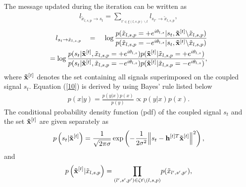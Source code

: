\documentclass[conference]{IEEEtran}
\begin{document}
The message updated during the iteration can be written as
\begin{equation}
\begin{aligned}
{l_{{{\tilde {x}}_{l,s,p}} \to {s_t}}} = \sum\limits_{_{t' \in \xi (l,s,p)\backslash t}} {{l_{{s_{t'}} \to {{\tilde {x}}_{l,s,p}}}}}\label{9},
\end{aligned}
\end{equation}
\begin{equation}
\begin{aligned}
{l_{{s_t} \to {{\tilde {x}}_{l,s,p}}}}\;\;\;{\kern 1pt}  = \;\;\;{\kern 1pt} \log \frac{{p({{\tilde {x}}_{l,s,p}} =  + {e^{i{\theta _{l,s}}}}|{s_t},{{\bf{\tilde x}}^{[t]}}\backslash {{\tilde {x}}_{l,s,p}})}}{{p({{\tilde {x}}_{l,s,p}} =  - {e^{i{\theta _{l,s}}}}|{s_t},{{\bf{\tilde x}}^{[t]}}\backslash {{\tilde {x}}_{l,s,p}})}} \\
= \log \frac{{p({s_t}|{{\bf{\tilde x}}^{[t]}},{{\tilde {x}}_{l,s,p}} =  + {e^{i{\theta _{l,s}}}})p({{\bf{\tilde x}}^{[t]}}|{{\tilde {x}}_{l,s,p}} =  + {e^{i{\theta _{l,s}}}})}}{{p({s_t}|{{\bf{\tilde x}}^{[t]}},{{\tilde {x}}_{l,s,p}} =  - {e^{i{\theta _{l,s}}}})p({{\bf{\tilde x}}^{[t]}}|{{\tilde {x}}_{l,s,p}} =  - {e^{i{\theta _{l,s}}}})}}\label{10},
\end{aligned}
\end{equation}
where ${{\bf{\tilde {\bf{x}}}}^{[t]}}$ denotes the set containing all signals superimposed on the coupled signal ${{s_t}}$. Equation (\ref{10}) is derived by using Bayes' rule listed below
\begin{equation}
\begin{aligned}
p(x|y) = \frac{{p(y|x)p(x)}}{{p(y)}}\propto p(y|x)p(x)\label{11}.
\end{aligned}
\end{equation}
The conditional probability density function (pdf) of the coupled signal ${{s_t}}$ and the set ${{\bf{\tilde x}}^{[t]}}$ are given separately as
\begin{equation}
p\left( {{s_t}|{{\bf{\tilde x}}^{[t]}}} \right) = \frac{1}{{\sqrt {2\pi \sigma } }}\exp \left( { - {\mkern 1mu} \frac{1}{{2{\sigma ^2}}}{{\left\| {{s_t} - {{\bf{h}}^{[t]T}}{{\bf{\tilde x}}^{[t]}}} \right\|}^2}} \right)\label{12},
\end{equation}
and
\begin{equation}
\begin{aligned}
p\left( {{{\bf{\tilde x}}^{[t]}}|{{\tilde {x}}_{l,s,p}}} \right) = {\prod _{(l',s',p') \in \zeta t\backslash (l,s,p)}}p({\tilde {x}_{l',s',p'}})\label{13},
\end{aligned}
\end{equation}
\end{document}
